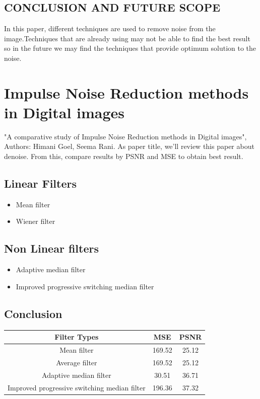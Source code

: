 \subsection{CONCLUSION AND FUTURE SCOPE}
In this paper, different techniques are used to remove noise from the image.Techniques that are already using may not be able to find the best result so in the future we may find the techniques that provide optimum solution to the noise.


\section{Impulse Noise Reduction
methods in Digital images
}

"A comparative study of Impulse Noise Reduction methods in Digital images", Authors: Himani Goel, Seema Rani. As paper title, we'll review this paper about denoise. From this, compare results by PSNR and MSE to obtain best result. 

\subsection{Linear Filters}
\begin{itemize}
\item Mean filter
\item Wiener filter
\end{itemize}

\subsection{Non Linear filters}
\begin{itemize}
\item Adaptive median
filter
\item Improved progressive
switching median
filter
\end{itemize}

\subsection{Conclusion}
\begin{center}


\begin{tabular}{|c|c|c|}
\hline 
Filter Types & MSE & PSNR \\ 
\hline 
Mean filter & 169.52 & 25.12 \\ 
\hline 
Average filter & 169.52 & 25.12 \\ 
\hline 
Adaptive median
filter & 30.51 & 36.71 \\ 
\hline 
Improved progressive
switching median
filter & 196.36 & 37.32
 \\ 
\hline 
\end{tabular} 
\end{center}


